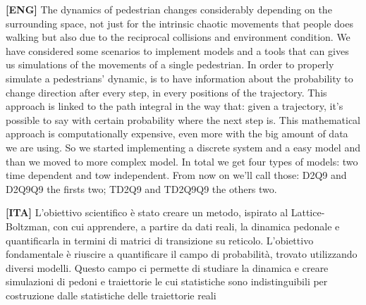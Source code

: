 \documentclass{standalone}
\begin{document}
\textbf{[ENG]}
The dynamics of pedestrian changes considerably depending on the surrounding space,
not just for the intrinsic chaotic movements that people does walking but also due to the reciprocal collisions and environment condition.
We have considered some scenarios to implement models and a tools that can gives us simulations of the movements of a single pedestrian.
In order to properly simulate a pedestrians' dynamic, is to have information about the probability to change direction after every step, in every positions of the trajectory.
This approach is linked to the path integral in the way that: given a trajectory, it's possible to say with certain probability where the next step is.
This mathematical approach is computationally expensive, even more with the big amount of data we are using.
So we started implementing a discrete system and a easy model and than we moved to more complex model.
In total we get four types of models: two time dependent and tow independent.
From now on we'll call those: D2Q9 and D2Q9Q9 the firsts two;
TD2Q9 and TD2Q9Q9 the others two.

\textbf{[ITA]}
L'obiettivo scientifico è stato creare un metodo, ispirato al Lattice-Boltzman, con cui apprendere, a partire
da dati reali, la dinamica pedonale e quantificarla in termini di matrici di transizione su reticolo.
L'obiettivo fondamentale è riuscire a quantificare il campo di probabilità, trovato utilizzando diversi modelli.
Questo campo ci permette di studiare la dinamica e creare simulazioni di pedoni e traiettorie le cui statistiche
sono indistinguibili per costruzione dalle statistiche delle traiettorie reali
\end{document}
